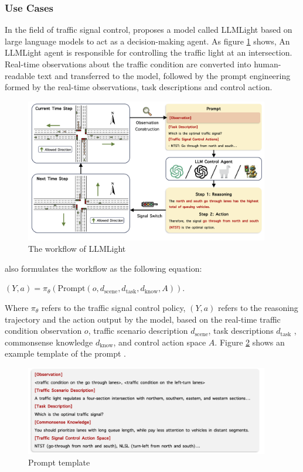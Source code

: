\documentclass[runningheads]{llncs}
\begin{document}
\subsubsection{Use Cases}
\noindent \newline
In the field of traffic signal control, \cite{Lai23} proposes a model called LLMLight based on large language models to act as a decision-making agent. As figure \ref{fig:llmlight} shows,
An LLMLight agent is responsible for controlling the traffic light at an intersection. Real-time observations about the traffic condition are converted into human-readable text and transferred to 
the model, followed by the prompt engineering formed by the real-time observations, task descriptions and control action.
\begin{figure}[htbp]
  \centering
  \includegraphics[width=0.95\textwidth]{LLMLight.PNG}
  \caption{The workflow of LLMLight \cite{Lai23}}
  \label{fig:llmlight}
\end{figure}
\cite{Lai23} also formulates the workflow as the following equation:
\begin{definition}
  $(Y, a) = \pi_{\theta}(\text{Prompt}(o, d_{\text{scene}}, d_{\text{task}}, d_{\text{know}}, A))$.
\end{definition}
Where $\pi_{\theta}$ refers to the traffic signal control policy, $(Y, a)$ refers to the reasoning trajectory and the action output by the model,
based on the real-time traffic condition observation $o$, traffic scenario description $d_{\text{scene}}$, task descriptions $d_{\text{task}}$ , commonsense knowledge $d_{\text{know}}$, and control action space $A$.
Figure \ref{fig:llmlight_prompt} shows an example template of the prompt \cite{Lai23}.
\begin{figure}[htbp]
  \centering
  \includegraphics[width=0.95\textwidth]{Prompt LLMLight.PNG}
  \caption{Prompt template \cite{Lai23}}
  \label{fig:llmlight_prompt}
\end{figure}
\end{document}
